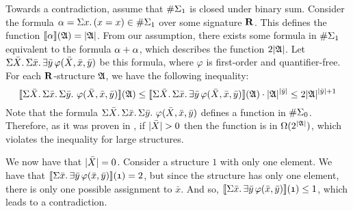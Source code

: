 Towards a contradiction, assume that $\#\Sigma_{1}$ is closed under binary sum. 
Consider the formula $\alpha = \Sigma{x}.\,(x = x) \in \#\Sigma_{1}$ over some signature $\mathbf{R}$. 
This defines the function ${\llbracket{}{\alpha}\rrbracket}(\mathfrak{A}) = \vert \mathfrak{A} \vert$. 
From our assumption, there exists some formula in $\#\Sigma_{1}$ equivalent to the formula $\alpha + \alpha$, which describes the function $2\vert \mathfrak{A} \vert$. 
Let $\Sigma{\bar{X}}.\,\Sigma{\bar{x}}.\,\exists\bar{y}\,\varphi(\bar{X},\bar{x},\bar{y})$ be this formula, where $\varphi$ is first-order and quantifier-free. 
For each $\mathbf{R}$-structure $\mathfrak{A}$, we have the following inequality:
$$
{\llbracket{}{\Sigma{\bar{X}}.\,\Sigma{\bar{x}}.\,\Sigma{\bar{y}}.\,\,\varphi(\bar{X},\bar{x},\bar{y})}\rrbracket}(\mathfrak{A})
\leq 
{\llbracket{}{\Sigma{\bar{X}}.\,\Sigma{\bar{x}}.\,\exists\bar{y}\,\varphi(\bar{X},\bar{x},\bar{y})}\rrbracket}(\mathfrak{A}) \cdot  \vert \mathfrak{A} \vert^{\vert \bar{y} \vert} \leq 2\vert \mathfrak{A} \vert^{\vert \bar{y} \vert+1} 
$$
Note that the formula $\Sigma{\bar{X}}.\,\Sigma{\bar{x}}.\,\Sigma{\bar{y}}.\,\,\varphi(\bar{X},\bar{x},\bar{y})$ defines a function in $\#\Sigma_{0}$. 
Therefore, as it was proven in \cite{SalujaST95}, if $\vert \bar{X} \vert > 0$ then the function is in $\Omega(2^{\vert \mathfrak{A} \vert})$, which violates the inequality for large structures.

We now have that $\vert \bar{X} \vert = 0$.
Consider a structure $\mathfrak{1}$ with only one element. 
We have that ${\llbracket{}{\Sigma{\bar{x}}.\,\exists\bar{y}\,\varphi(\bar{x},\bar{y})}\rrbracket}(\mathfrak{1}) = 2$, but since the structure has only one element, there is only one possible assignment to $\bar{x}$. 
And so, ${\llbracket{}{\Sigma{\bar{x}}.\,\exists\bar{y}\,\varphi(\bar{x},\bar{y})}\rrbracket}(\mathfrak{1}) \leq 1$, which leads to a contradiction.
